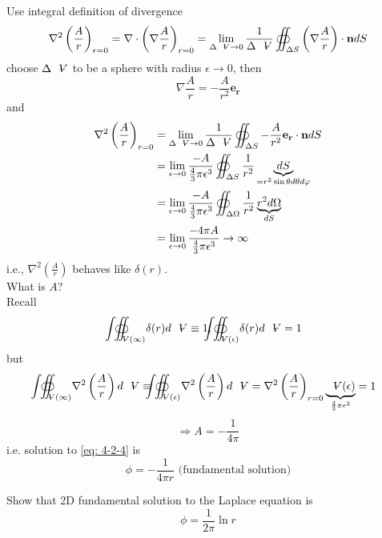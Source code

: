 \begin{itemize}
Use integral definition of divergence
\[
\nabla^2\left(\frac{A}{r}\right)_{r=0}=\nabla\cdot\left(\nabla\frac{A}{r}\right)_{r=0} = \lim_{\Delta\volume\to 0}\frac{1}{\Delta\volume}\oiint_{\Delta S}\left(\nabla\frac{A}{r}\right)\cdot\mathbf{n}dS
\]
choose $\Delta\volume$ to be a sphere with radius $\epsilon\to 0$, then 
\[
\nabla\frac{A}{r} = -\frac{A}{r^2}\mathbf{e_r}
\]
and
\begin{align*}
\nabla^2\left(\frac{A}{r}\right)_{r=0}
&= \lim_{\Delta\volume\to 0}\frac{1}{\Delta\volume}\oiint_{\Delta S}-\frac{A}{r^2}\mathbf{e_r}\cdot\mathbf{n}dS \\
&= \lim_{\epsilon\to 0}\frac{-A}{\frac{4}{3}\pi\epsilon^3}\oiint_{\Delta S}\frac{1}{r^2}\underbrace{dS}_{=r^2\sin\theta d\theta d\varphi}\\
&= \lim_{\epsilon\to 0}\frac{-A}{\frac{4}{3}\pi\epsilon^3}\oiint_{\Delta \Omega}\frac{1}{r^2}\underbrace{r^2d\Omega}_{dS} \\
&= \lim_{\epsilon\to 0}\frac{-4\pi A}{\frac{4}{3}\pi\epsilon^3} \to \infty
\end{align*}
i.e., $\displaystyle\nabla^2\left(\frac{A}{r}\right)$ behaves like $\delta(r)$.\\
What is $A$?\\
Recall 
\[
{\oiint \hspace{-23.5pt} \int}_{\volume(\infty)}\delta(r)d\volume\equiv 1, {\oiint \hspace{-23.5pt} \int}_{\volume(\epsilon)}\delta(r)d\volume= 1
\]
but 
\[
{\oiint \hspace{-23.5pt} \int}_{\volume(\infty)}\nabla^2\left(\frac{A}{r}\right)d\volume\equiv{\oiint \hspace{-23.5pt} \int}_{\volume(\epsilon)}\nabla^2\left(\frac{A}{r}\right)d\volume = \nabla^2\left(\frac{A}{r}\right)_{r=0}\underbrace{\volume(\epsilon)}_{\frac{4}{3}\pi\epsilon^3} = 1
\]
\[
\Longrightarrow A = -\frac{1}{4\pi}
\]
i.e. solution to \eqref{eq: 4-2-4} is 
\begin{equation}
\boxed{\phi = -\frac{1}{4\pi r}}\text{ (fundamental solution)}
\label{eq: 4-2-5}
\end{equation}
\begin{exercise}{Show that 2D fundamental solution to the Laplace equation is}
\[
\boxed{\phi = \frac{1}{2\pi}\ln r}
\]
\end{exercise}
\end{itemize}
